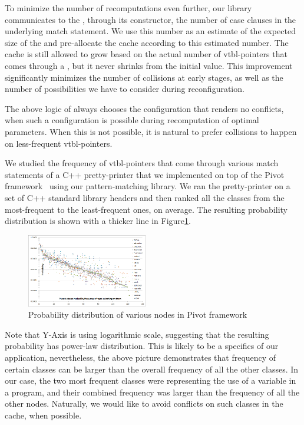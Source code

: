 To minimize the number of recomputations even further, our library communicates 
to the , through its constructor, the number of case clauses in 
the underlying match statement. We use this number as an estimate of the expected 
size of the  and pre-allocate the cache according to this estimated 
number. The cache is still allowed to grow based on the actual number of 
vtbl-pointers that comes through a , but it never shrinks from the
initial value. This improvement significantly minimizes the number of collisions 
at early stages, as well as the number of possibilities we have to consider 
during reconfiguration.

The above logic of  always chooses the configuration that renders 
no conflicts, when such a configuration is possible during recomputation of 
optimal parameters. When this is not possible, it is natural to prefer collisions 
to happen on less-frequent vtbl-pointers.

We studied the frequency of vtbl-pointers that come through various match statements
of a C++ pretty-printer that we implemented on top of the Pivot 
framework~\cite{Pivot09} using our pattern-matching library. We ran the 
pretty-printer on a set of C++ standard library headers and then ranked all the  
classes from the most-frequent to the least-frequent ones, on average. The 
resulting probability distribution is shown with a thicker line in 
Figure\ref{fig:PowerLaw}.

\begin{figure}[htbp]
  \centering
    \includegraphics[width=0.47\textwidth]{std-lib-power-law-distributions.png}
  \caption{Probability distribution of various nodes in Pivot framework}
  \label{fig:PowerLaw}
\end{figure}

Note that Y-Axis is using logarithmic scale, suggesting that the resulting 
probability has power-law distribution. This is likely to be a specifics of our 
application, nevertheless, the above picture demonstrates that frequency of certain 
classes can be larger than the overall frequency of all the other classes. In 
our case, the two most frequent classes were representing the use of a variable in 
a program, and their combined frequency was larger than the frequency of all the 
other nodes. Naturally, we would like to avoid conflicts on such classes in the 
cache, when possible.


